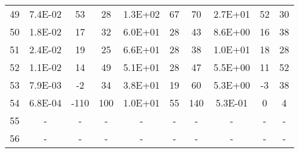 \begin{tabular}{cccccccccc}
49 & 7.4E-02 & 53 & 28 & 1.3E+02 & 67 & 70 & 2.7E+01 & 52 & 30 \\
50 & 1.8E-02 & 17 & 32 & 6.0E+01 & 28 & 43 & 8.6E+00 & 16 & 38 \\
51 & 2.4E-02 & 19 & 25 & 6.6E+01 & 28 & 38 & 1.0E+01 & 18 & 28 \\
52 & 1.1E-02 & 14 & 49 & 5.1E+01 & 28 & 47 & 5.5E+00 & 11 & 52 \\
53 & 7.9E-03 & -2 & 34 & 3.8E+01 & 19 & 60 & 5.3E+00 & -3 & 38 \\
54 & 6.8E-04 & -110 & 100 & 1.0E+01 & 55 & 140 & 5.3E-01 & 0 & 4 \\
55 &-&-&-&-&-&-&-&-&-\\
56 &-&-&-&-&-&-&-&-&-\\
\end{tabular}
